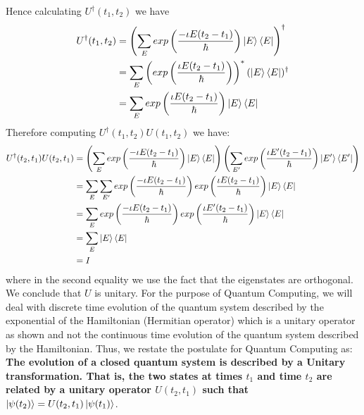 Hence calculating $U^{\dagger}(t_1,t_2)$ we have
\begin{align*}
U^{\dagger}(t_1,t_2)&=\left(\sum_E exp\left(\frac{-\iota E(t_2-t_1)}{\hbar}\right)\ket{E}\bra{E}\right)^{\dagger}\\
&=\sum_E \left(exp\left(\frac{\iota E(t_2-t_1)}{\hbar}\right)\right)^* (\ket{E}\bra{E})^{\dagger}\\
&=\sum_E exp\left(\frac{\iota E(t_2-t_1)}{\hbar}\right) \ket{E}\bra{E}
\end{align*}
Therefore computing $U^{\dagger}(t_1,t_2)U(t_1,t_2)$ we have:
\begin{align*}
    U^{\dagger}(t_2,t_1)U(t_2,t_1)&=\left(\sum_E exp\left(\frac{-\iota E(t_2-t_1)}{\hbar}\right)\ket{E}\bra{E}\right)\left(\sum_{E'}exp\left(\frac{\iota E'(t_2-t_1)}{\hbar}\right)\ket{E'}\bra{E'}\right)\\
    &=\sum_E\sum_{E'}exp\left(\frac{-\iota E(t_2-t_1)}{\hbar} \right) exp\left(\frac{\iota E(t_2-t_1)}{\hbar}\right)\ket{E}\bra{E}\\
    &=\sum_E exp\left(\frac{-\iota E(t_2-t_1)}{\hbar}\right) exp\left(\frac{\iota E'(t_2-t_1)}{\hbar}\right)\ket{E}\bra{E}\\
    &=\sum_E \ket{E}\bra{E}\\
    &=I
\end{align*}
where in the second equality we use the fact that the eigenstates are orthogonal. We conclude that $U$ is unitary.
For the purpose of Quantum Computing, we will deal with discrete time evolution of the quantum system described by the exponential of the Hamiltonian (Hermitian operator) 
which is a unitary operator as shown and not the continuous time evolution of the quantum system described by the Hamiltonian. Thus, we restate the postulate for Quantum Computing as:
\textbf{The evolution of a closed quantum system is described by a Unitary transformation. That is, the two states at times $t_1$ and time $t_2$ are related by
a unitary operator $U(t_2,t_1)$ such that $\ket{\psi(t_2)}=U(t_2,t_1)\ket{\psi(t_1)}$}.

